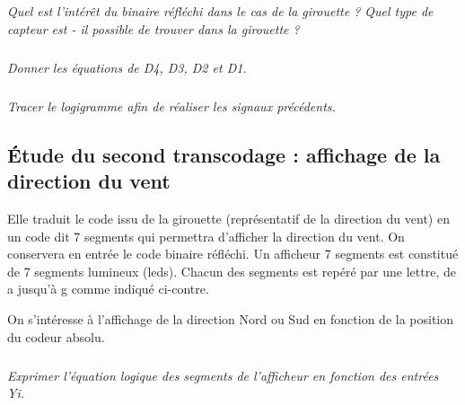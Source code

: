 \documentclass[10pt]{article}
\begin{document}
\subparagraph{}
\textit{Quel est l’intérêt du binaire réfléchi dans le cas de la girouette ? Quel type de capteur est - il possible de trouver dans la girouette ?}

\subparagraph{}
\textit{Donner les équations de D4, D3, D2 et D1.}

\subparagraph{}
\textit{Tracer le logigramme afin de réaliser les signaux précédents. }


\subsection{Étude du second transcodage : affichage de la direction du vent}


\begin{minipage}[c]{.5\linewidth}

Elle traduit le code issu de la girouette (représentatif de la direction du vent) en un code dit 7 segments qui permettra d'afficher la direction du vent. On conservera en entrée le code binaire réfléchi.
Un afficheur 7 segments est constitué de 7 segments lumineux (leds). Chacun des segments est repéré par une lettre, de a jusqu'à g comme indiqué ci-contre. 

On s’intéresse à l’affichage de la direction Nord ou Sud en fonction de la position du codeur absolu.

\subparagraph{}
\textit{Exprimer l’équation logique des segments de l’afficheur en fonction des entrées Yi.}

\end{minipage} \hfill
\end{document}
